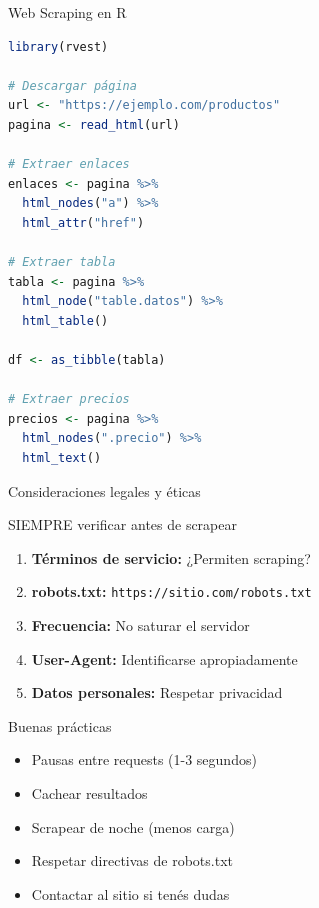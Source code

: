 \documentclass[aspectratio=169]{beamer}
\begin{document}
\begin{frame}[fragile]{Web Scraping en R}
\begin{lstlisting}[language=R]
library(rvest)

# Descargar página
url <- "https://ejemplo.com/productos"
pagina <- read_html(url)

# Extraer enlaces
enlaces <- pagina %>%
  html_nodes("a") %>%
  html_attr("href")

# Extraer tabla
tabla <- pagina %>%
  html_node("table.datos") %>%
  html_table()

df <- as_tibble(tabla)

# Extraer precios
precios <- pagina %>%
  html_nodes(".precio") %>%
  html_text()
\end{lstlisting}
\end{frame}

\begin{frame}{Consideraciones legales y éticas}
\begin{alertblock}{SIEMPRE verificar antes de scrapear}
\begin{enumerate}
    \item \textbf{Términos de servicio:} ¿Permiten scraping?
    \item \textbf{robots.txt:} \texttt{https://sitio.com/robots.txt}
    \item \textbf{Frecuencia:} No saturar el servidor
    \item \textbf{User-Agent:} Identificarse apropiadamente
    \item \textbf{Datos personales:} Respetar privacidad
\end{enumerate}
\end{alertblock}

\pause

\begin{exampleblock}{Buenas prácticas}
\begin{itemize}
    \item Pausas entre requests (1-3 segundos)
    \item Cachear resultados
    \item Scrapear de noche (menos carga)
    \item Respetar directivas de robots.txt
    \item Contactar al sitio si tenés dudas
\end{itemize}
\end{exampleblock}
\end{frame}
\end{document}
